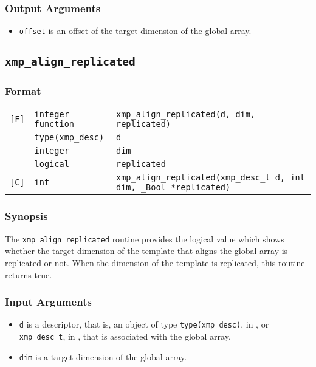\subsubsection*{Output Arguments}
\begin{itemize}
 \item {\tt offset} is an offset of the target dimension of the global array.
\end{itemize}


\subsection{\tt xmp\_align\_replicated}

\subsubsection*{Format}

\begin{tabular}{lll}

\verb![F]!& {\tt integer function}& {\tt xmp\_align\_replicated(d, dim, replicated)}\\
          & {\tt type(xmp\_desc)} & {\tt d}\\
          & {\tt integer} & {\tt dim}\\
          & {\tt logical} & {\tt replicated}\\

\verb![C]!&  {\tt int}& {\tt xmp\_align\_replicated(xmp\_desc\_t d, int dim, \_Bool *replicated)}\\

\end{tabular}

\subsubsection*{Synopsis}

The {\tt xmp\_align\_replicated} routine provides the logical value which shows whether the target dimension of the template that aligns the global array is replicated or not.
  When the dimension of the template is replicated, this routine returns true.


\subsubsection*{Input Arguments}
\begin{itemize}
 \item {\tt d} is a descriptor, that is, an object of type 
       {\tt type(xmp\_desc)}, in {\XMPF}, or {\tt xmp\_desc\_t},
       in {\XMPC}, that is associated with the global array.
 \item {\tt dim} is a target dimension of the global array.
\end{itemize}

